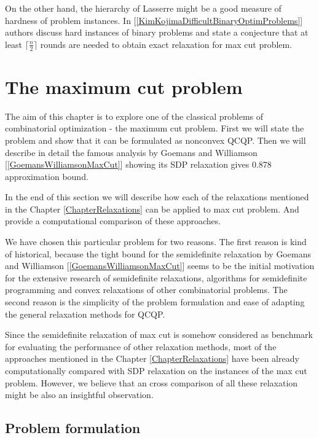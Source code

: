 \documentclass[12pt]{book}
\theoremstyle{definition}
\begin{document}
On the other hand, the hierarchy of Lasserre might be a good measure of hardness of problem instances. In [\ref{KimKojimaDifficultBinaryOptimProblems}]
authors discuss hard instances of binary problems and state a conjecture that at least $\lceil\frac{n}{2}\rceil$ rounds are needed to obtain exact relaxation for max cut problem.



\chapter{The maximum cut problem}

 The aim of this chapter is to explore one of the classical problems of combinatorial optimization - the maximum cut problem. First we will state the problem and show that it can be formulated as nonconvex QCQP. Then we will describe in detail the famous analysis by Goemans and Williamson [\ref{GoemansWilliamsonMaxCut}] showing its SDP relaxation gives 0.878 approximation bound. 
 
In the end of this section we will describe how each of the relaxations mentioned in the Chapter \ref{ChapterRelaxations} can be applied to max cut problem. And provide a computational comparison of these approaches.





We have chosen this particular problem for two reasons. The first reason is kind of historical, because the tight bound for the semidefinite relaxation by Goemans and Williamson [\ref{GoemansWilliamsonMaxCut}] seems to be the initial motivation for the extensive research of semidefinite relaxations, algorithms for semidefinite programming and convex relaxations of other combinatorial problems. The second reason is the simplicity of the problem formulation and ease of adapting the general relaxation methods for QCQP.

Since the semidefinite relaxation of max cut is somehow considered as benchmark for evaluating the performance of other relaxation methods, 
most of the approaches mentioned in the Chapter \ref{ChapterRelaxations} have been already computationally compared with SDP relaxation on the instances of the max cut problem. However, we believe that an cross comparison of all these relaxation might be also an insightful observation.



\section{Problem formulation}
\end{document}
